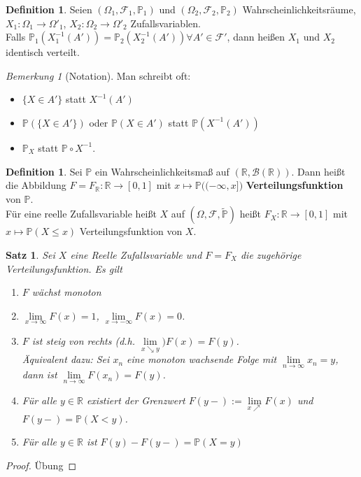 \documentclass[10pt,a4paper]{article}
\newcommand{\R}{\ensuremath{\mathbb{R}}}
\newcommand{\Bor}{\mathscr B}
\newcommand{\Prb}{\mathbb P}
\newcommand{\scF}{\ensuremath{\mathscr{F}}}
\theoremstyle{plain}
\newtheorem{satz}[theorem]{Satz}
\theoremstyle{definition}
\newtheorem{definition}[theorem]{Definition}
\theoremstyle{remark}
\newtheorem{bem}[theorem]{Bemerkung}
\begin{document}
	\begin{definition}
		Seien $(\Omega_1,\scF_1,\Prb_1)$ und $(\Omega_2,\scF_2,\Prb_2)$ Wahrscheinlichkeitsräume, $X_1:\Omega_1\to\Omega'_1$, $X_2:\Omega_2\to\Omega'_2$ Zufallsvariablen.\\
		Falls $\Prb_1(X^{-1}_1(A'))=\Prb_2(X_2^{-1}(A'))\forall A'\in\scF'$, dann heißen $X_1$ und $X_2$ identisch verteilt.
	\end{definition}

	\begin{bem}[Notation]
		Man schreibt oft:
		\begin{itemize}
			\item $\{X\in A'\}$ statt $X^{-1}(A')$
			\item $\Prb(\{X\in A'\})$ oder $\Prb(X\in A')$ statt $\Prb(X^{-1}(A'))$
			\item $\Prb_X$ statt $\Prb\circ X^{-1}$.
		\end{itemize}
	\end{bem}

\addtocounter{theorem}{-1}
	\begin{definition}\label{0140def}
		Sei $\Prb$ ein Wahrscheinlichkeitsmaß auf $(\R,\Bor(\R))$. Dann heißt die Abbildung $F=F_\R:\R\to[0,1]$ mit $x\mapsto\Prb\big((-\infty,x]\big)$ \textbf{Verteilungsfunktion} von $\Prb$.\\
		Für eine reelle Zufallsvariable heißt $X$ auf $(\Omega,\scF,\tilde{\Prb})$ heißt $F_X:\R\to[0,1]$ mit $x\mapsto\Prb(X\leq x)$ Verteilungsfunktion von $X$.
	\end{definition}

	\begin{satz}\label{0141satz}
		Sei $X$ eine Reelle Zufallsvariable und $F=F_X$ die zugehörige Verteilungsfunktion. Es gilt
		\begin{enumerate}
			\item $F$ wächst monoton
			\item $\lim\limits_{x\to\infty}F(x)=1$, $\lim\limits_{x\to-\infty}F(x)=0$.
			\item $F$ ist steig von rechts (d.h. $\lim\limits_{x\searrow y})F(x)=F(y)$.\\
			Äquivalent dazu: Sei $x_n$ eine monoton wachsende Folge mit $\lim\limits_{n\to\infty}x_n=y$, dann ist $\lim\limits_{n\to\infty}F(x_n)=F(y)$.
			\item Für alle $y\in\R$ existiert der Grenzwert $F(y-):=\lim\limits_{x\nearrow}F(x)$ und $F(y-)=\Prb(X<y)$.
			\item Für alle $y\in\R$ ist $F(y)-F(y-)=\Prb(X=y)$
		\end{enumerate}
	\end{satz}
	\begin{proof}
		Übung %
	\end{proof}
	
\end{document}
